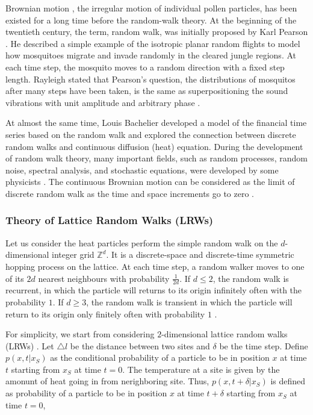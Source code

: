 Brownian motion \cite{brown1828microscopical}, the irregular motion of
individual pollen particles, has been existed for a long time before
the random-walk theory. At the beginning of the twentieth century, the
term, random walk, was initially proposed by Karl Pearson
\cite{pearson1905problem}. He described a simple example of the
isotropic planar random flights to model how mosquitoes migrate and
invade randomly in the cleared jungle regions. At each time step, the
mosquito moves to a random direction with a fixed step
length. Rayleigh \cite{rayleigh1905problem} stated that Pearson's
question, the distributions of mosquitos after many steps have been
taken, is the same as superpositioning the sound vibrations with unit
amplitude and arbitrary phase \cite{de2012flying}.


At almost the same time, Louis Bachelier \cite{bachelier1900theorie}
developed a model of the financial time series based on the random
walk and explored the connection between discrete random walks and
continuous diffusion (heat) equation. During the development of random
walk theory, many important fields, such as random processes, random
noise, spectral analysis, and stochastic equations, were developed by
some physicists \cite{einstein1905electrodynamics}
\cite{einstein1906theory} \cite{smoluchowski1916drei}. The continuous
Brownian motion can be considered as the limit of discrete random walk
as the time and space increments go to zero \cite{lawler2010random}.



\subsubsection{Theory of Lattice Random Walks (LRWs)}

Let us consider the heat particles perform the simple random walk on
the $d$-dimensional integer grid $\mathbb{Z}^d$. It is a
discrete-space and discrete-time symmetric hopping process
\cite{redner2001guide} on the lattice. At each time step, a random
walker moves to one of its $2d$ nearest neighbours with probability
$\frac{1}{2d}$. If $d \leq 2$, the random walk is recurrent, in which
the particle will returns to its origin infinitely often with the
probability $1$. If $d \geq 3$, the random walk is transient in which
the particle will return to its origin only finitely often with
probability $1$ \cite{hughes1998random}.


For simplicity, we start from considering $2$-dimensional lattice
random walks (LRWs) \cite{lawler2010random}. Let $\triangle l$ be the
distance between two sites and $\delta$ be the time step. Define $p(x,
t| x_{S})$ as the conditional probability of a particle to be in
position $x$ at time $t$ starting from $x_{S}$ at time $t=0$. The
temperature at a site is given by the amonunt of heat going in from
nerighboring site. Thus, $p(x, t + \delta |x_{S})$ is defined as
probability of a particle to be in position $x$ at time $t + \delta$
starting from $x_{S}$ at time $t=0$,


